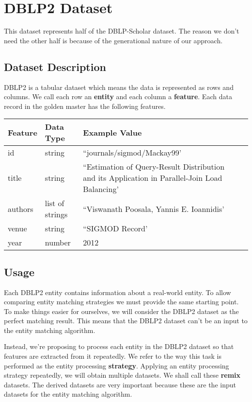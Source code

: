 \documentclass[a4paper,12pt]{article}
\begin{document}
\section{DBLP2 Dataset}
    This dataset represents half of the DBLP-Scholar dataset. The reason we
    don't need the other half is because of the generational nature of our
    approach.
\subsection{Dataset Description}
    DBLP2 is a tabular dataset which means the data is represented as rows
    and columns. We call each row an \textbf{entity} and each column a
    \textbf{feature}. Each data record in the golden master has the
    following features.
    \begin{center}
        \begin{tabular}{llll}
            \toprule
            Feature & Data Type & Example Value \\
            \midrule
            id & string & ``journals/sigmod/Mackay99' \\
            title & string & ``Estimation of Query-Result Distribution and its Application in Parallel-Join Load Balancing' \\
            authors & list of strings & ``Viswanath Poosala, Yannis E. Ioannidis' \\
            venue & string & ``SIGMOD Record' \\
            year & number & 2012 \\
            \bottomrule
        \end{tabular}
    \end{center}
\subsection{Usage}
\begin{FlushLeft}
    Each DBLP2 entity contains information about a real-world entity.
    To allow comparing entity matching strategies we must provide the same
    starting point. To make things easier for ourselves, we will consider
    the DBLP2 dataset as the perfect matching result. This means that the
    DBLP2 dataset can't be an input to the entity matching algorithm.
\end{FlushLeft}
\begin{FlushLeft}
    Instead, we're proposing to process each entity in the DBLP2 dataset
    so that features are extracted from it repeatedly. We refer to the way
    this task is performed as the entity processing \textbf{strategy}.
    Applying an entity processing strategy repeatedly, we will obtain multiple
    datasets. We shall call these \textbf{remix} datasets. The derived
    datasets are very important because these are the input datasets for the
    entity matching algorithm.
\end{FlushLeft}
\end{document}
